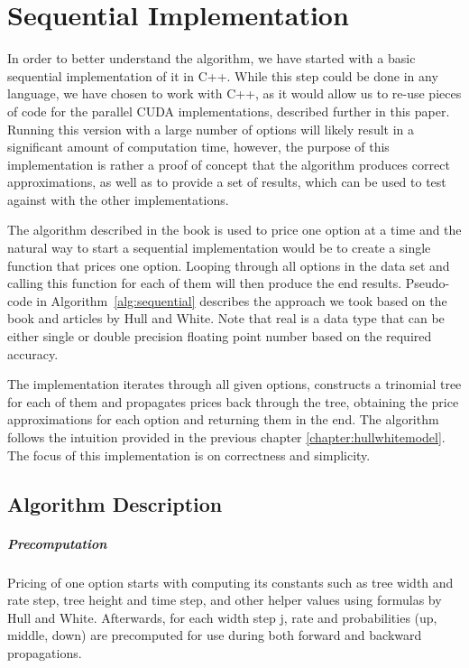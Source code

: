 \chapter{Sequential Implementation}
\label{chapter:sequential}
In order to better understand the algorithm, we have started with a basic sequential implementation of it in C++. While this step could be done in any language, we have chosen to work with C++, as it would allow us to re-use pieces of code for the parallel CUDA implementations, described further in this paper. Running this version with a large number of options will likely result in a significant amount of computation time, however, the purpose of this implementation is rather a proof of concept that the algorithm produces correct approximations, as well as to provide a set of results, which can be used to test against with the other implementations.

The algorithm described in the book is used to price one option at a time and the natural way to start a sequential implementation would be to create a single function that prices one option. Looping through all options in the data set and calling this function for each of them will then produce the end results. Pseudo-code in Algorithm~\ref{alg:sequential} describes the approach we took based on the book and articles by Hull and White. Note that real is a data type that can be either single or double precision floating point number based on the required accuracy.

The implementation iterates through all given options, constructs a trinomial tree for each of them and propagates prices back through the tree, obtaining the price approximations for each option and returning them in the end. The algorithm follows the intuition provided in the previous chapter \ref{chapter:hullwhitemodel}. The focus of this implementation is on correctness and simplicity.

\pagebreak
\section{Algorithm Description}
\paragraph{Precomputation}
Pricing of one option starts with computing its constants such as tree width and rate step, tree height and time step, and other helper values using formulas by Hull and White. Afterwards, for each width step j, rate and probabilities (up, middle, down) are precomputed for use during both forward and backward propagations.

